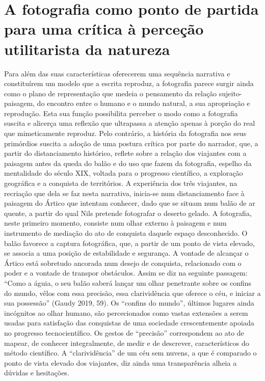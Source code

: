 \documentclass{article}
\begin{document}
\section{A fotografia como ponto de partida para uma crítica à perceção utilitarista da natureza}
Para além das suas características oferecerem uma sequência narrativa e constituírem um modelo que a escrita reproduz, a fotografia parece surgir ainda como o plano
de representação que medeia o pensamento da relação sujeito-paisagem, do encontro
entre o humano e o mundo natural, a sua apropriação e reprodução. Esta sua função
possibilita perceber o modo como a fotografia suscita e alicerça uma reflexão que
ultrapassa a atenção apenas à porção do real que mimeticamente reproduz. Pelo contrário, a história da fotografia nos seus primórdios suscita a adoção de uma postura
crítica por parte do narrador, que, a partir do distanciamento histórico, reflete sobre
a relação dos viajantes com a paisagem antes da queda do balão e do uso que fazem
da fotografia, espelho da mentalidade do século XIX, voltada para o progresso científico, a exploração geográfica e a conquista de territórios.
A experiência dos três viajantes, na recriação que dela se faz nesta narrativa,
inicia-se num distanciamento face à paisagem do Ártico que intentam conhecer, dado
que se situam num balão de ar quente, a partir do qual Nils pretende fotografar o
deserto gelado. A fotografia, neste primeiro momento, consiste num olhar externo à
paisagem e num instrumento de mediação do ato de conquista daquele espaço desconhecido. O balão favorece a captura fotográfica, que, a partir de um ponto de vista
elevado, se associa a uma posição de estabilidade e segurança. A vontade de alcançar
o Ártico está sobretudo ancorada num desejo de conquista, relacionado com o poder
e a vontade de transpor obstáculos. Assim se diz na seguinte passagem: “Como a
águia, o seu balão saberá lançar um olhar penetrante sobre os confins do mundo, vêlos com essa precisão, essa clarividência que oferece o céu, e iniciar a sua possessão”
(Gaudy 2019, 59). Os “confins do mundo”, últimos lugares ainda incógnitos ao olhar
humano, são percecionados como vastas extensões a serem usadas para satisfação
das conquistas de uma sociedade crescentemente apoiada no progresso tecnocientífico. Os gestos de “precisão” correspondem ao ato de mapear, de conhecer integralmente, de medir e de descrever, característicos do método científico. A “clarividência”
de um céu sem nuvens, a que é comparado o ponto de vista elevado dos viajantes, diz
ainda uma transparência alheia a dúvidas e hesitações.
\end{document}
